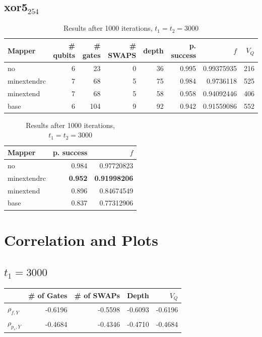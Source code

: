 \documentclass[11pt]{article}
\begin{document}
\subsection{xor5\(_{\text{254}}\)}
\label{sec:orgf6783f1}
\begin{table}[H]
\caption{\label{tab:org05eae46}
Results after 1000 iterations, \(t_1 = t_2 = 3000\)}
\centering
\small
\begin{tabular}{lrrrrrrr}
\hline
Mapper & \# qubits & \# gates & \# SWAPS & depth & p. success & \(f\) & \(V_Q\)\\
\hline
no & 6 & 23 & 0 & 36 & 0.995 & 0.99375935 & 216\\
\hline
minextendrc & 7 & 68 & 5 & 75 & 0.984 & 0.9736118 & 525\\
minextend & 7 & 68 & 5 & 58 & 0.958 & 0.94092446 & 406\\
base & 6 & 104 & 9 & 92 & 0.942 & 0.91559086 & 552\\
\hline
\end{tabular}
\end{table}

\begin{table}[H]
\caption{\label{tab:org713eb0b}
Results after 1000 iterations, \(t_1 = t_2 = 3000\)}
\centering
\small
\begin{tabular}{lrr}
\hline
Mapper & p. success & \(f\)\\
\hline
no & 0.984 & 0.97720823\\
\hline
minextendrc & \textbf{0.952} & \textbf{0.91998206}\\
minextend & 0.896 & 0.84674549\\
base & 0.837 & 0.77312906\\
\hline
\end{tabular}
\end{table}

\section{Correlation and Plots}
\label{sec:org30058ca}

\subsection{\(t_1=3000\)}
\label{sec:orgbcfdece}

\begin{center}
\begin{tabular}{lrrrr}
 & \# of Gates & \# of SWAPs & Depth & \(V_Q\)\\
\hline
\(\rho _{f,Y}\) & -0.6196 & -0.5598 & -0.6093 & -0.6196\\
\(\rho _{p_s,Y}\) & -0.4684 & -0.4346 & -0.4710 & -0.4684\\
\hline
\end{tabular}
\end{center}
\end{document}
